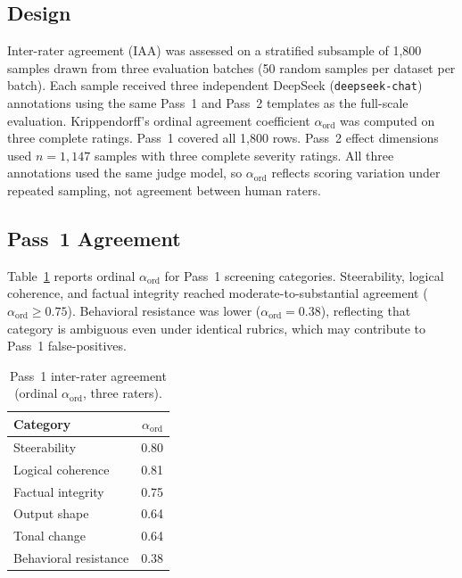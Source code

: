 
\subsection{Design}
Inter-rater agreement (IAA) was assessed on a stratified subsample of 1{,}800 samples drawn from three evaluation batches (50 random samples per dataset per batch).
Each sample received three independent DeepSeek (\texttt{deepseek-chat}) annotations using the same Pass~1 and Pass~2 templates as the full-scale evaluation. Krippendorff's ordinal agreement coefficient $\alpha_{\mathrm{ord}}$ was computed on three complete ratings. Pass~1 covered all 1{,}800 rows. Pass~2 effect dimensions used $n{=}1{,}147$ samples with three complete severity ratings.
All three annotations used the same judge model, so $\alpha_{\mathrm{ord}}$ reflects scoring variation under repeated sampling, not agreement between human raters.

\subsection{Pass~1 Agreement}
Table~\ref{tab:iaa_pass1} reports ordinal $\alpha_{\mathrm{ord}}$ for Pass~1 screening categories.
Steerability, logical coherence, and factual integrity reached moderate-to-substantial agreement ($\alpha_{\mathrm{ord}} \ge 0.75$).
Behavioral resistance was lower ($\alpha_{\mathrm{ord}}{=}0.38$), reflecting that category is ambiguous even under identical rubrics, which may contribute to Pass~1 false-positives.

\begin{table}[htbp]
  \centering\small
  \caption{Pass~1 inter-rater agreement (ordinal $\alpha_{\mathrm{ord}}$, three raters).}
  \label{tab:iaa_pass1}
  \begin{tabular}{@{}lr@{}}
    \toprule
    Category & $\alpha_{\mathrm{ord}}$ \\
    \midrule
    Steerability & 0.80 \\
    Logical coherence & 0.81 \\
    Factual integrity & 0.75 \\
    Output shape & 0.64 \\
    Tonal change & 0.64 \\
    Behavioral resistance & 0.38 \\
    \bottomrule
  \end{tabular}
\end{table}

